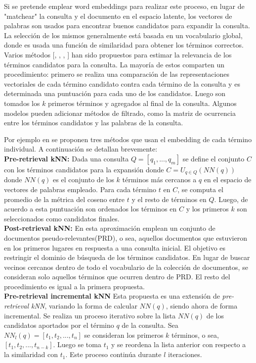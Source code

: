 \documentclass{llncs}
\begin{document}
Si se pretende emplear word embeddings para realizar este proceso, en lugar de "matchear" la consulta y el documento en el espacio latente, los vectores de palabras son usados para encontrar buenos candidatos para expandir la consulta. La selección de los mismos generalmente está basada en un vocabulario global, donde es usada una función de similaridad para obtener los términos correctos. Varios métodos [\cite{160}, \cite{190}, \cite{191}, \cite{165}] han sido propuestos para estimar la relevancia de los términos candidatos para la consulta. La mayoría de estos comparten un procedimiento: primero se realiza una comparación de las representaciones vectoriales de cada término candidato contra cada término de la consulta y es determinada una puntuación para cada uno de los candidatos. Luego son tomados los $k$ primeros términos y agregados al final de la consulta. Algunos modelos \cite{192} pueden adicionar métodos de filtrado, como la matriz de ocurrencia entre los términos candidatos y las palabras de la consulta. 

Por ejemplo en \cite{190} se proponen tres métodos que usan el embedding de cada término individual. A continuación se detallan brevemente:
\\

\textbf{Pre-retrieval kNN: } Dada una consulta $Q = [q_1, ..., q_m]$ se define el conjunto $C$ con los términos candidatos para la expansión donde $C = U_{q \in Q}(NN(q)) $ donde $NN(q)$ es el conjunto de los $k$ términos más cercanos a $q$ en el espacio de vectores de palabras empleado. Para cada término $t$ en $C$, se computa el promedio de la métrica del coseno entre $t$ y el resto de términos en $Q$. Luego, de acuerdo a esta puntuación son ordenados los términos en $C$ y los primeros $k$ son seleccionados como candidatos finales.
\\

\textbf{Post-retrieval kNN: } En esta aproximación emplean un conjunto de documentos pseudo-relevantes(PRD), o sea, aquellos documentos que estuvieron en los primeros lugares en respuesta a una consulta inicial. El objetivo es restringir el dominio de búsqueda de los términos candidatos. En lugar de buscar vecinos cercanos dentro de todo el vocabulario de la colección de documentos, se consideran solo aquellos términos que ocurren dentro de PRD. El resto del procedimiento es igual a la primera propuesta.
\\

\textbf{Pre-retrieval incremental kNN}
Esta propuesta es una extensión de \textit{pre-retrieval kNN}, variando la forma de calcular $NN(q)$, siendo ahora de forma incremental. Se realiza un proceso iterativo sobre la lista $NN(q)$ de los candidatos aportados por el término $q$ de la consulta. Sea $NN_l(q) = [t_1, t_2, ..., t_n]$ se consideran los primeros $k$ términos, o sea, $[t_1, t_2, ..., t_{n-k}]$. Luego se toma $t_1$ y se reordena la lista anterior con respecto a la similaridad con $t_1$. Este proceso continúa durante $l$ iteraciones.
\end{document}

